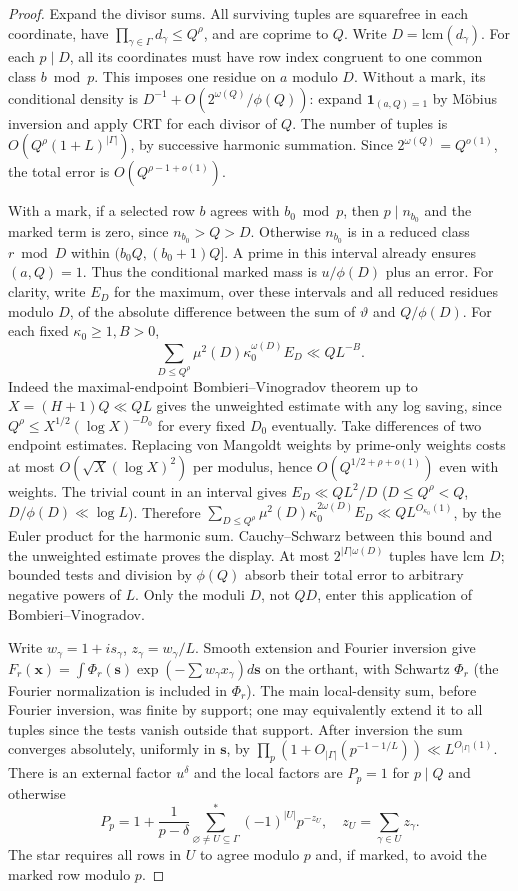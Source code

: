 \documentclass[11pt]{article}
\theoremstyle{remark}
\numberwithin{equation}{section}
\newcommand{\ind}{\mathbf 1}
\begin{document}
\begin{proof}
Expand the divisor sums. All surviving tuples are squarefree in each
coordinate, have $\prod_{\gamma\in\Gamma}d_\gamma\le Q^\rho$,
and are coprime to $Q$. Write $D=\mathrm{lcm}(d_\gamma)$.
For each $p\mid D$, all its coordinates must have row index congruent
to one common class $b\bmod p$. This imposes one residue on $a$ modulo
$D$. Without a mark, its conditional density is
$D^{-1}+O(2^{\omega(Q)}/\phi(Q))$: expand $\ind_{(a,Q)=1}$ by
M\"obius inversion and apply CRT for each divisor of $Q$. The number of
tuples is $O(Q^\rho(1+L)^{|\Gamma|})$, by successive harmonic summation.
Since $2^{\omega(Q)}=Q^{o(1)}$, the total error is $O(Q^{\rho-1+o(1)})$.

With a mark, if a selected row $b$ agrees with $b_0\bmod p$, then
$p\mid n_{b_0}$ and the marked term is zero, since $n_{b_0}>Q>D$.
Otherwise $n_{b_0}$ is in a reduced class $r\bmod D$ within
$(b_0Q,(b_0+1)Q]$. A prime in this interval already ensures $(a,Q)=1$.
Thus the conditional marked mass is $u/\phi(D)$ plus an error.
For clarity, write $E_D$ for the maximum, over these intervals and
all reduced residues modulo $D$, of the absolute difference between the
sum of $\vartheta$ and $Q/\phi(D)$. For each fixed $\kappa_0\ge1,B>0$,
\[
 \sum_{D\le Q^\rho}\mu^2(D)\kappa_0^{\omega(D)}E_D\ll QL^{-B}.
\]
Indeed the maximal-endpoint Bombieri--Vinogradov theorem \cite{Bombieri,Vaughan} up to
$X=(H+1)Q\ll QL$ gives the unweighted estimate with any log saving,
since $Q^\rho\le X^{1/2}(\log X)^{-D_0}$ for every fixed $D_0$ eventually.
Take differences of two endpoint estimates. Replacing von Mangoldt
weights by prime-only weights costs at most
$O(\sqrt X(\log X)^2)$ per modulus, hence $O(Q^{1/2+\rho+o(1)})$ even
with weights. The trivial count in an interval gives
$E_D\ll Q L^2/D$ ($D\le Q^\rho<Q$, $D/\phi(D)\ll\log L$).
Therefore $\sum_{D\le Q^\rho}\mu^2(D)\kappa_0^{2\omega(D)}E_D
\ll Q L^{O_{\kappa_0}(1)}$, by the Euler product for the harmonic sum.
Cauchy--Schwarz between this bound and the unweighted estimate proves
the display. At most $2^{|\Gamma|\omega(D)}$ tuples have lcm $D$;
bounded tests and division by $\phi(Q)$ absorb their total error to
arbitrary negative powers of $L$. Only the moduli $D$, not $QD$,
enter this application of Bombieri--Vinogradov.

Write $w_\gamma=1+is_\gamma$, $z_\gamma=w_\gamma/L$. Smooth extension
and Fourier inversion give
$F_r(\mathbf x)=\int\Phi_r(\mathbf s)\exp(-\sum w_\gamma x_\gamma)d\mathbf s$
on the orthant, with Schwartz $\Phi_r$ (the Fourier normalization
is included in $\Phi_r$). The main local-density sum, before Fourier
inversion, was finite by support; one may equivalently extend it to
all tuples since the tests vanish outside that support.
After inversion the sum converges absolutely, uniformly in $\mathbf s$,
by $\prod_p(1+O_{|\Gamma|}(p^{-1-1/L}))\ll L^{O_{|\Gamma|}(1)}$.
There is an external factor $u^\delta$ and the local factors are
$P_p=1$ for $p\mid Q$ and otherwise
\[
 P_p=1+\frac1{p-\delta}
 \sum_{\varnothing\ne U\subseteq\Gamma}^{*}
 (-1)^{|U|}p^{-z_U},\quad z_U=\sum_{\gamma\in U}z_\gamma.
\]
The star requires all rows in $U$ to agree modulo $p$ and, if marked,
to avoid the marked row modulo $p$.


\end{proof}
\end{document}
